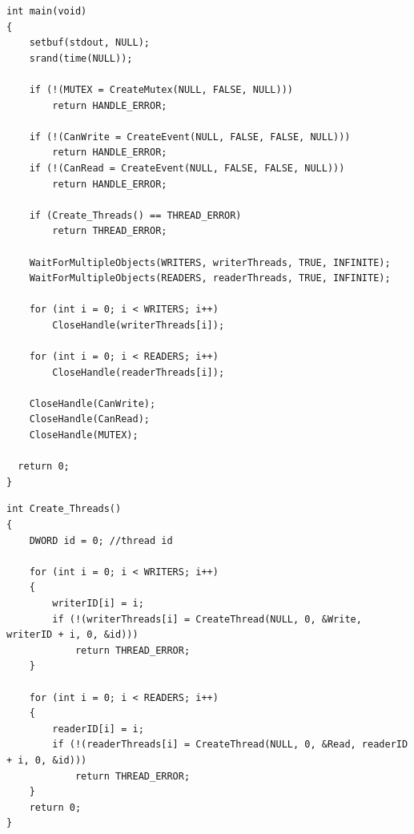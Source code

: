 \documentclass[12pt]{report}
\begin{document}
\begin{lstlisting}[label=some-code,caption=Код подпрограммы main()]
int main(void)
{
    setbuf(stdout, NULL);
    srand(time(NULL));
    
    if (!(MUTEX = CreateMutex(NULL, FALSE, NULL)))
        return HANDLE_ERROR;
       
    if (!(CanWrite = CreateEvent(NULL, FALSE, FALSE, NULL)))
        return HANDLE_ERROR;
    if (!(CanRead = CreateEvent(NULL, FALSE, FALSE, NULL)))
        return HANDLE_ERROR;
    
    if (Create_Threads() == THREAD_ERROR)
        return THREAD_ERROR;
  
    WaitForMultipleObjects(WRITERS, writerThreads, TRUE, INFINITE);
    WaitForMultipleObjects(READERS, readerThreads, TRUE, INFINITE);
    
    for (int i = 0; i < WRITERS; i++)
        CloseHandle(writerThreads[i]);

    for (int i = 0; i < READERS; i++)
        CloseHandle(readerThreads[i]);

    CloseHandle(CanWrite);
    CloseHandle(CanRead);
    CloseHandle(MUTEX);
    
  return 0;
}
\end{lstlisting}

\begin{lstlisting}[label=some-code,caption=Код подпрограммы создания потоков]
int Create_Threads()
{
    DWORD id = 0; //thread id
    
    for (int i = 0; i < WRITERS; i++)
    {
        writerID[i] = i;
        if (!(writerThreads[i] = CreateThread(NULL, 0, &Write, writerID + i, 0, &id)))
            return THREAD_ERROR;
    }

    for (int i = 0; i < READERS; i++)
    {
        readerID[i] = i;
        if (!(readerThreads[i] = CreateThread(NULL, 0, &Read, readerID + i, 0, &id)))
            return THREAD_ERROR;
    }
    return 0;
}
\end{lstlisting}
\end{document}
